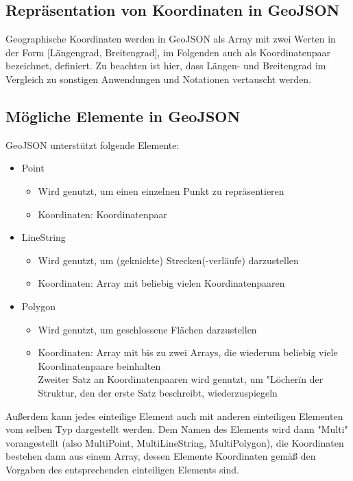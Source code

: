 \subsection{Repräsentation von Koordinaten in GeoJSON}

Geographische Koordinaten werden in GeoJSON als Array mit zwei Werten in der Form [Längengrad, Breitengrad], im Folgenden auch als Koordinatenpaar bezeichnet, definiert. Zu beachten ist hier, dass Längen- und Breitengrad im Vergleich zu sonstigen Anwendungen und Notationen vertauscht werden.

\subsection{Mögliche Elemente in GeoJSON}

GeoJSON unterstützt folgende Elemente:

\begin{itemize}
    \item Point
        \begin{itemize}
            \item Wird genutzt, um einen einzelnen Punkt zu repräsentieren
            \item Koordinaten: Koordinatenpaar
        \end{itemize}
    \item LineString
        \begin{itemize}
            \item Wird genutzt, um (geknickte) Strecken(-verläufe) darzustellen
            \item Koordinaten: Array mit beliebig vielen Koordinatenpaaren
        \end{itemize}
    \item Polygon
        \begin{itemize}
            \item Wird genutzt, um geschlossene Flächen darzustellen
            \item Koordinaten: Array mit bis zu zwei Arrays, die wiederum beliebig viele Koordinatenpaare beinhalten
                    \\ Zweiter Satz an Koordinatenpaaren wird genutzt, um "Löcher\" in der Struktur, den der erste Satz beschreibt, wiederzuspiegeln
        \end{itemize}
\end{itemize}

Außerdem kann jedes einteilige Element auch mit anderen einteiligen Elementen vom selben Typ dargestellt werden. Dem Namen des Elements wird dann "Multi" vorangestellt (also MultiPoint, MultiLineString, MultiPolygon), die Koordinaten bestehen dann aus einem Array, dessen Elemente Koordinaten gemäß den Vorgaben des entsprechenden einteiligen Elements sind.

